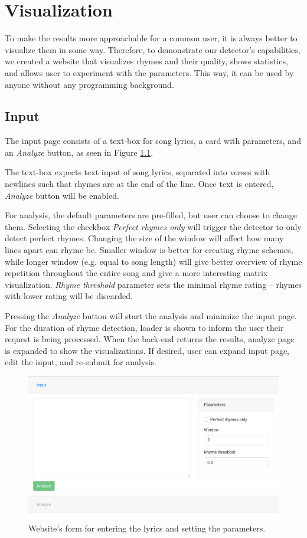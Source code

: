 \chapter{Visualization}
To make the results more approachable for a common user, it is always better to visualize them in some way. Therefore, to demonstrate our detector's capabilities, we created a website that visualizes rhymes and their quality, shows statistics, and allows user to experiment with the parameters. This way, it can be used by anyone without any programming background.

\section{Input}
The input page consists of a text-box for song lyrics, a card with parameters, and an \textit{Analyze} button, as seen in Figure \ref{web-form}.

The text-box expects text input of song lyrics, separated into verses with newlines such that rhymes are at the end of the line. Once text is entered, \textit{Analyze} button will be enabled.

For analysis, the default parameters are pre-filled, but user can choose to change them. Selecting the checkbox \textit{Perfect rhymes only} will trigger the detector to only detect perfect rhymes. Changing the size of the window will affect how many lines apart can rhyme be. Smaller window is better for creating rhyme schemes, while longer window (e.g. equal to song length) will give better overview of rhyme repetition throughout the entire song and give a more interesting matrix visualization. \textit{Rhyme threshold} parameter sets the minimal rhyme rating -- rhymes with lower rating will be discarded.

Pressing the \textit{Analyze} button will start the analysis and minimize the input page. For the duration of rhyme detection, loader is shown to inform the user their request is being processed. When the back-end returns the results, analyze page is expanded to show the visualizations. If desired, user can expand input page, edit the input, and re-submit for analysis.

\begin{figure}[h]\centering
	\includegraphics[scale=0.3]{../img/web-empty-form.png}
	\caption{Website's form for entering the lyrics and setting the parameters.}
	\label{web-form}
\end{figure}

